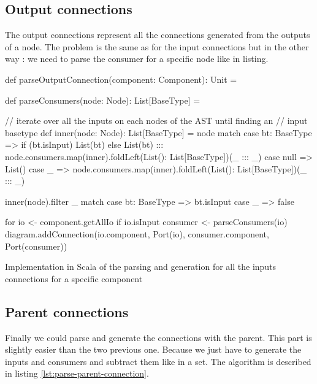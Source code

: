 \subsection{Output connections}
\label{sec:output-connections}

The output connections represent all the connections generated from the outputs
of a node. The problem is the same as for the input connections but in the other
way : we need to parse the consumer for a specific node like in listing.

\begin{listing}[H]
  \centering
  \begin{scalacode}
  def parseOutputConnection(component: Component): Unit = {
      
    def parseConsumers(node: Node): List[BaseType] = {
      
      // iterate over all the inputs on each nodes of the AST until finding an
      // input basetype
      def inner(node: Node): List[BaseType] = node match {
        case bt: BaseType =>
          if (bt.isInput) List(bt)
          else List(bt) ::: node.consumers.map(inner).foldLeft(List(): List[BaseType])(_ ::: _)
        case null => List()
        case _ => node.consumers.map(inner).foldLeft(List(): List[BaseType])(_ ::: _)
      }

      inner(node).filter {
        _ match {
          case bt: BaseType => bt.isInput
          case _ => false
        }
      }
    }

    for {
      io <- component.getAllIo
      if io.isInput
      consumer <- parseConsumers(io)
    } {
      diagram.addConnection(io.component, Port(io), consumer.component, Port(consumer))
    }
  }
  \end{scalacode}
  \caption[Parsing and generation of the outputs connections]{Implementation in
    Scala of the parsing and generation for all the inputs connections for a
    specific component}
  \label{lst:parse-output-connection-scala}
\end{listing}

\subsection{Parent connections}
\label{sec:parent-connections}

Finally we could parse and generate the connections with the parent. This part
is slightly easier than the two previous one. Because we just have to generate
the inputs and consumers and subtract them like in a set. The algorithm is
described in listing \ref{lst:parse-parent-connection}.

